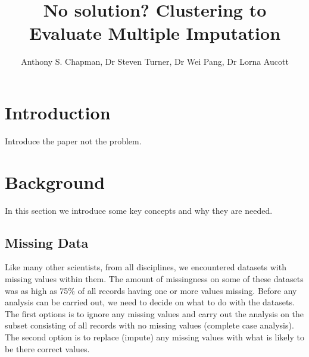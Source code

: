 \documentclass{IEEEconf}
\title{No solution? Clustering to Evaluate Multiple Imputation }
\author{Anthony S. Chapman, Dr Steven Turner, Dr Wei Pang, Dr Lorna Aucott}
\begin{document}
 
	\maketitle{} 





	\section{Introduction} %
	\label{sec:introduction}
		Introduce the paper not the problem.

	\section{Background} %
	\label{sec:background}

	In this section we introduce some key concepts and why they are needed. 

		\subsection{Missing Data} %
		\label{sub:missing_data}
		Like many other scientists, from all disciplines, we encountered datasets with missing values within them\cite{bigData}. The amount of missingness on some of these datasets was as high as 75\% of all records having one or more values missing. Before any analysis can be carried out, we need to decide on what to do with the datasets. The first options is to ignore any missing values and carry out the analysis on the subset consisting of all records with no missing values (complete case analysis). The second option is to replace (impute) any missing values with what is likely to be there correct values.
\end{document}
